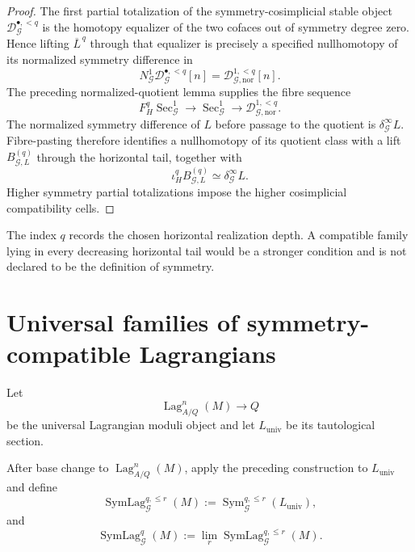 \begin{proof}
The first partial totalization of the symmetry-cosimplicial stable object
$\mathcal D_{\mathcal G}^{\bullet,<q}$ is the homotopy equalizer of the two
cofaces out of symmetry degree zero.  Hence lifting $\overline L^{\,q}$ through that
equalizer is precisely a specified nullhomotopy of its normalized symmetry difference
in
\[
N_{\mathcal G}^1\mathcal D_{\mathcal G}^{\bullet,<q}[n]
=
\mathcal D_{\mathcal G,\mathrm{nor}}^{1,<q}[n].
\]
The preceding normalized-quotient lemma supplies the fibre sequence
\[
F_H^q\operatorname{Sec}_{\mathcal G}^1
\longrightarrow
\operatorname{Sec}_{\mathcal G}^1
\longrightarrow
\mathcal D_{\mathcal G,\mathrm{nor}}^{1,<q}.
\]
The normalized symmetry difference of $L$ before passage to the quotient is
$\delta_{\mathcal G}^{\infty}L$.  Fibre-pasting therefore identifies a
nullhomotopy of its quotient class with a lift
$B_{\mathcal G,L}^{(q)}$ through the horizontal tail, together with
\[
\iota_H^qB_{\mathcal G,L}^{(q)}
\simeq
\delta_{\mathcal G}^{\infty}L.
\]
Higher symmetry partial totalizations impose the higher cosimplicial compatibility
cells.
\end{proof}

\begin{remark}
\label{rem:symmetry-noether-no-inverse-limit-in-the-horizontal-stage}
The index $q$ records the chosen horizontal realization depth.  A compatible
family lying in every decreasing horizontal tail would be a stronger condition
and is not declared to be the definition of symmetry.
\end{remark}

\section{Universal families of symmetry-compatible Lagrangians}
\label{sec:symmetry-noether-universal-families-of-symmetry-compatible-lagrangians}

Let
\[
\operatorname{Lag}_{A/Q}^n(M)\longrightarrow Q
\]
be the universal Lagrangian moduli object and let $L_{\mathrm{univ}}$ be its
tautological section.

\begin{construction}
\label{constr:symmetry-noether-universal-symmetry-family}
After base change to $\operatorname{Lag}_{A/Q}^n(M)$, apply the preceding
construction to $L_{\mathrm{univ}}$ and define
\[
\operatorname{SymLag}_{\mathcal G}^{q,\le r}(M)
:=
\operatorname{Sym}_{\mathcal G}^{q,\le r}(L_{\mathrm{univ}}),
\]
and
\[
\operatorname{SymLag}_{\mathcal G}^{q}(M)
:=
\lim_r
\operatorname{SymLag}_{\mathcal G}^{q,\le r}(M).
\]
\end{construction}

